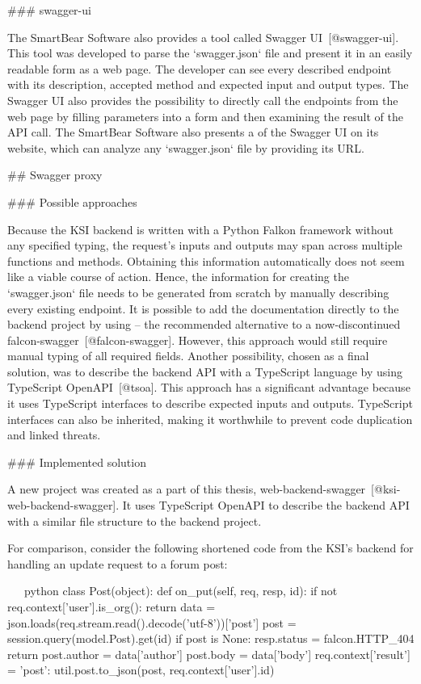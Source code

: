 \documentclass[
  digital, %
  oneside, %
  lof,     %
  nolot,     %
]{fithesis4}
\begin{document}
### swagger-ui

The SmartBear Software also provides a tool called Swagger UI~[@swagger-ui]. This tool was developed to parse the `swagger.json` file and present it in an easily readable form as a web page. The developer can see every described endpoint with its description, accepted method and expected input and output types. The Swagger UI also provides the possibility to directly call the endpoints from the web page by filling parameters into a form and then examining the result of the API call. The SmartBear Software also presents a  of the Swagger UI on its website, which can analyze any `swagger.json` file by providing its URL.

## Swagger proxy

### Possible approaches

Because the KSI backend is written with a Python Falkon framework without any specified typing, the request's inputs and outputs may span across multiple functions and methods. Obtaining this information automatically does not seem like a viable course of action. Hence, the information for creating the `swagger.json` file needs to be generated from scratch by manually describing every existing endpoint. It is possible to add the documentation directly to the backend project by using  -- the recommended alternative to a now-discontinued falcon-swagger~[@falcon-swagger]. However, this approach would still require manual typing of all required fields. Another possibility, chosen as a final solution, was to describe the backend API with a TypeScript language by using TypeScript OpenAPI~[@tsoa]. This approach has a significant advantage because it uses TypeScript interfaces to describe expected inputs and outputs. TypeScript interfaces can also be inherited, making it worthwhile to prevent code duplication and linked threats.

### Implemented solution

A new project was created as a part of this thesis, web-backend-swagger~[@ksi-web-backend-swagger]. It uses TypeScript OpenAPI to describe the backend API with a similar file structure to the backend project. 

For comparison, consider the following shortened code from the KSI's backend for handling an update request to a forum post:

\newpage
~~~python
class Post(object):
    def on_put(self, req, resp, id):
        if not req.context['user'].is_org():
            return
        data = json.loads(req.stream.read().decode('utf-8'))['post']
        post = session.query(model.Post).get(id)
        if post is None:
            resp.status = falcon.HTTP_404
            return
        post.author = data['author']
        post.body = data['body']
        req.context['result'] = {'post': util.post.to_json(post, req.context['user'].id)}
~~~
\end{document}
